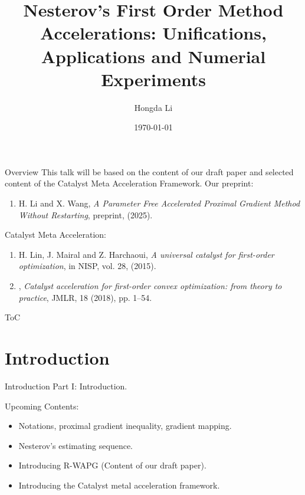 \documentclass[11pt]{beamer}
\author{Hongda Li}
\title[Thesis Proposal Talk]{Nesterov's First Order Method Accelerations: Unifications, Applications  and Numerial Experiments}
\institute[UBCO]{
    University of British Columbia Okanagan
}
\date{\today}
\theoremstyle{definition}
\begin{document}
\begin{frame}
    \titlepage
\end{frame}
\begin{frame}{Overview}
    This talk will be based on the content of our draft paper and selected content of the Catalyst Meta Acceleration Framework. 
    Our preprint: 
    \begin{enumerate}
        \item H. Li and X. Wang, \textit{A Parameter Free Accelerated Proximal Gradient Method Without Restarting}, preprint, (2025).
    \end{enumerate}
    Catalyst Meta Acceleration:  
    \begin{enumerate}
        \item H. Lin, J. Mairal and Z. Harchaoui, \textit{A universal catalyst for first-order optimization}, in NISP, vol. 28, (2015). 
        \item \underline{\hspace{4em}}, \textit{Catalyst acceleration for first-order convex optimization: from theory to practice}, JMLR, 18 (2018), pp. 1–54.
    \end{enumerate}
\end{frame}

\begin{frame}[allowframebreaks]{ToC}
    \tableofcontents
\end{frame}


\section{Introduction}
    \begin{frame}{Introduction}
        Part I: Introduction. 
        \begin{block}{Upcoming Contents: }
            \begin{itemize}
                \item Notations, proximal gradient inequality, gradient mapping. 
                \item Nesterov's estimating sequence.
                \item Introducing R-WAPG (Content of our draft paper). 
                \item Introducing the Catalyst metal acceleration framework. 
            \end{itemize}
        \end{block}
    \end{frame}
\end{document}
